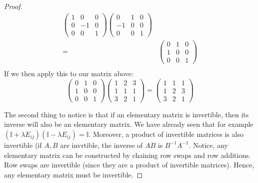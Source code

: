 \documentclass{exam}
\begin{document}
\begin{proof}
\begin{align*}
\begin{pmatrix}
        1 & 0 & 0 \\
        0 & -1 & 0 \\
        0 & 0 & 1
    \end{pmatrix}
    \begin{pmatrix}
        0 & 1 & 0 \\
        -1 & 0 & 0 \\
        0 & 0 & 1
    \end{pmatrix}
    \\
    =&
    \begin{pmatrix}
        0 & 1 & 0 \\
        1 & 0 & 0 \\
        0 & 0 & 1
    \end{pmatrix}
    \\
\end{align*}
If we then apply this to our matrix above:
\[
\begin{pmatrix}
        0 & 1 & 0 \\
        1 & 0 & 0 \\
        0 & 0 & 1
    \end{pmatrix}
    \begin{pmatrix}
        1 & 2 & 3 \\
        1 & 1 & 1 \\
        3 & 2 & 1
        \end{pmatrix}
    =
    \begin{pmatrix}
        1 & 1 & 1 \\
        1 & 2 & 3 \\
        3 & 2 & 1
        \end{pmatrix}
\]

The second thing to notice is that if an elementary matrix is invertible, then its inverse will also be an elementary matrix. We have already seen that for example $(\mathbb{I} + \lambda E_{ij})(\mathbb{I} - \lambda E_{ij}) = \mathbb{I}$. Moreover, a product of invertible matrices is also invertible (if $A,B$ are invrtible, the inverse of $AB$ is $B^{-1}A^{-1}$. Notice, any elementary matrix can be constructed by chaining row swaps and row additions. Row swaps are invertible (since they are a product of invertible matrices). Hence, any elementary matrix must be invertible.

\bigskip


\end{proof}
\end{document}

